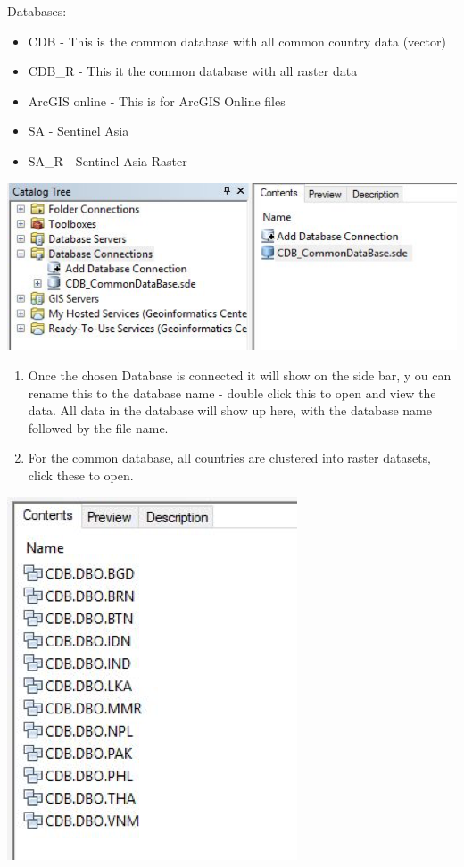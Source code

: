 \documentclass[]{book}
\theoremstyle{definition}
\theoremstyle{definition}
\theoremstyle{definition}
\theoremstyle{remark}
\begin{document}
Databases:

\begin{itemize}
\item
  CDB - This is the common database with all common country data
  (vector)
\item
  CDB\_R - This it the common database with all raster data
\item
  ArcGIS online - This is for ArcGIS Online files
\item
  SA - Sentinel Asia
\item
  SA\_R - Sentinel Asia Raster
\end{itemize}

\begin{center}\includegraphics[width=0.7\linewidth]{img/fig43_arcgis7} \end{center}

\begin{enumerate}
\def\labelenumi{\arabic{enumi}.}
\setcounter{enumi}{4}
\item
  Once the chosen Database is connected it will show on the side bar, y
  ou can rename this to the database name - double click this to open
  and view the data. All data in the database will show up here, with
  the database name followed by the file name.
\item
  For the common database, all countries are clustered into raster
  datasets, click these to open.
\end{enumerate}

\begin{center}\includegraphics[width=0.4\linewidth]{img/fig43_arcgis8a} \end{center}
\end{document}
